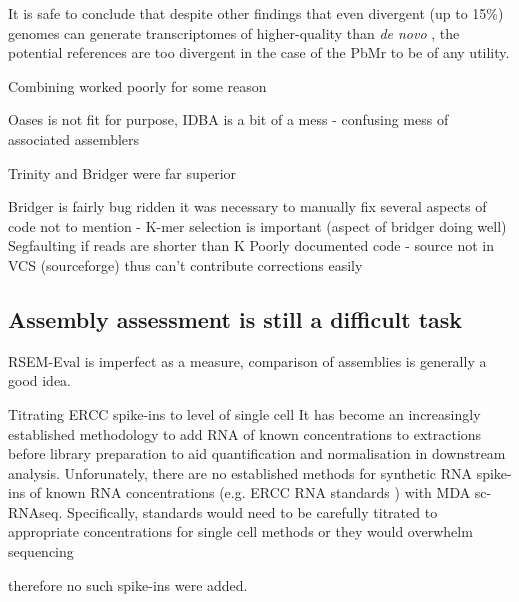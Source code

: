 It is safe to conclude that despite other findings that even divergent 
(up to 15\%) genomes can generate transcriptomes of higher-quality
than \textit{de novo} \citep{Vijay2013}, the potential references
are too divergent in the case of the PbMr to be of any utility.



Combining worked poorly for some reason

Oases is not fit for purpose, IDBA is a bit of a mess - confusing mess of 
associated assemblers 

Trinity and Bridger were far superior 

Bridger is fairly bug ridden it was necessary to manually fix several aspects
of code not to mention - K-mer selection is important (aspect of bridger doing well)
Segfaulting if reads are shorter than K
Poorly documented code - source not in VCS (sourceforge) thus can't contribute
corrections easily 


\subsection{Assembly assessment is still a difficult task}

RSEM-Eval is imperfect as a measure, comparison of assemblies is generally a good idea.


Titrating ERCC spike-ins to level of single cell 
It has become an increasingly established methodology to add RNA of known concentrations
to extractions before library preparation to aid quantification
and normalisation in downstream analysis. 
Unforunately, there are no established methods for synthetic RNA spike-ins
of known RNA concentrations (e.g. ERCC RNA standards \citep{Jiang2011}) with MDA
sc-RNAseq. Specifically, standards would need to be carefully titrated to appropriate
concentrations for single cell methods or they would overwhelm sequencing 


therefore no such spike-ins were added. 





